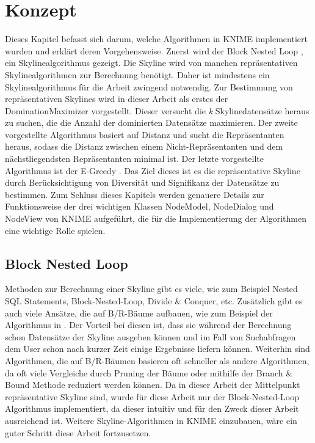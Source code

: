 \chapter{Konzept}
\label{ch:Konzept}
Dieses Kapitel befasst sich darum, welche Algorithmen in KNIME implementiert wurden und erklärt deren Vorgehensweise. Zuerst wird der Block Nested Loop \cite{borzsony2001skyline}, ein Skylinealgorithmus gezeigt. Die Skyline wird von manchen repräsentativen Skylinealgorithmen zur Berechnung benötigt. Daher ist mindestens ein Skylinealgorithmus für die Arbeit zwingend notwendig. Zur Bestimmung von repräsentativen Skylines wird in dieser Arbeit als erstes der DominationMaximizer \cite{4221657} vorgestellt. Dieser versucht die \textit{k} Skylinedatensätze heraus zu suchen, die die Anzahl der dominierten Datensätze maximieren. Der zweite vorgestellte Algorithmus basiert auf Distanz \cite{Tao:2009:DRS:1546683.1547325} und sucht die Repräsentanten heraus, sodass die Distanz zwischen einem Nicht-Repräsentanten und dem nächstliegendsten Repräsentanten minimal ist. Der letzte vorgestellte Algorithmus ist der E-Greedy \cite{magnani2014taking}. Das Ziel dieses ist es die repräsentative Skyline durch Berücksichtigung von Diversität und Signifikanz der Datensätze zu bestimmen.
Zum Schluss dieses Kapitels werden genauere Details zur Funktionsweise der drei wichtigen Klassen NodeModel, NodeDialog und NodeView von KNIME aufgeführt, die für die Implementierung der Algorithmen eine wichtige Rolle spielen.
\section{Block Nested Loop}
\label{ch:Analyse:sec:skyAlgos}
Methoden zur Berechnung einer Skyline gibt es viele, wie zum Beispiel Nested SQL Statements, Block-Nested-Loop, Divide \& Conquer, etc.
Zusätzlich gibt es auch viele Ansätze, die auf B/R-Bäume aufbauen, wie zum Beispiel der Algorithmus in \cite{Papadias:2003:OPA:872757.872814}. Der Vorteil bei diesen ist, dass sie während der Berechnung schon Datensätze der Skyline ausgeben können und im Fall von Suchabfragen dem User schon nach kurzer Zeit einige Ergebnisse liefern können. Weiterhin sind Algorithmen, die auf B/R-Bäumen basieren oft schneller als andere Algorithmen, da oft viele Vergleiche durch Pruning der Bäume oder mithilfe der Branch \& Bound Methode reduziert werden können. 
Da in dieser Arbeit der Mittelpunkt repräsentative Skyline sind, wurde für diese Arbeit nur der Block-Nested-Loop Algorithmus implementiert, da dieser intuitiv und für den Zweck dieser Arbeit ausreichend ist. Weitere Skyline-Algorithmen in KNIME einzubauen, wäre ein guter Schritt diese Arbeit fortzusetzen. 

